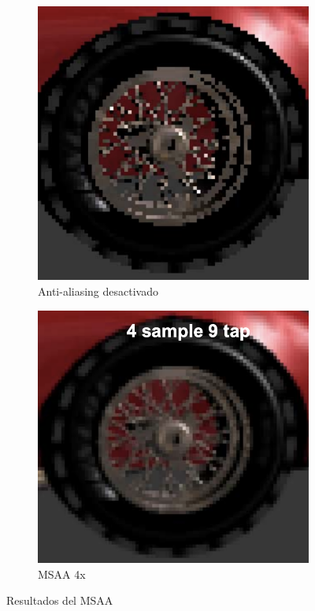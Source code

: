 \documentclass[withindex, glossary]{cam-thesis}
\begin{document}
\begin{figure}[!htbp]
    \centering
    \begin{subfigure}[b]{0.8\textwidth}
        \includegraphics[width=\textwidth]{figures/msaaoff.png}
        \caption{Anti-aliasing desactivado}
    \end{subfigure}
    \centering
    \begin{subfigure}[b]{0.8\textwidth}
        \includegraphics[width=\textwidth]{figures/msaa.png}
        \caption{MSAA 4x}
    \end{subfigure}
    \caption{Resultados del MSAA}
    \label{msaares}
\end{figure}
\end{document}
